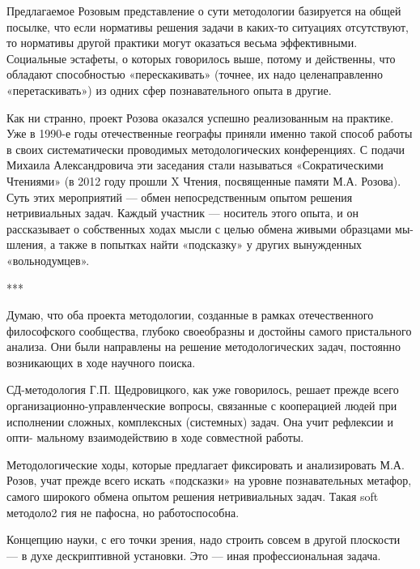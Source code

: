 \documentclass[11pt,a4paper]{article}
\begin{document}
Предлагаемое Розовым представление о сути методологии базируется на общей
посылке, что если нормативы решения задачи в каких-то ситуациях отсутствуют,
то нормативы другой практики могут оказаться весьма эффективными. Социальные
эстафеты, о которых говорилось выше, потому и действенны, что обладают
способностью «перескакивать» (точнее, их надо целенаправленно «перетаскивать»)
из одних сфер познавательного опыта в другие.

Как ни странно, проект Розова оказался успешно реализованным на
практике. Уже в 1990-е годы отечественные географы приняли именно такой
способ работы в своих систематически проводимых методологических
конференциях. С подачи Михаила Александровича эти заседания стали называться
«Сократическими Чтениями» (в 2012 году прошли X Чтения, посвященные памяти
М.А. Розова). Суть этих мероприятий — обмен непосредственным опытом решения
нетривиальных задач. Каждый участник — носитель этого опыта, и он
рассказывает о собственных ходах мысли с целью обмена живыми образцами мы-
шления, а также в попытках найти «подсказку» у других вынужденных
«вольнодумцев».

***

Думаю, что оба проекта методологии, созданные в рамках отечественного
философского сообщества, глубоко своеобразны и достойны самого пристального
анализа. Они были направлены на решение методологических задач, постоянно
возникающих в ходе научного поиска.

СД-методология Г.П. Щедровицкого, как уже говорилось, решает прежде всего
организационно-управленческие вопросы, связанные с кооперацией людей при
исполнении сложных, комплексных (системных) задач. Она учит рефлексии и опти-
мальному взаимодействию в ходе совместной работы.

Методологические ходы, которые предлагает фиксировать и анализировать
М.А. Розов, учат прежде всего искать «подсказки» на уровне познавательных
метафор, самого широкого обмена опытом решения нетривиальных задач. Такая
soft методоло2 гия не пафосна, но работоспособна.

Концепцию науки, с его точки зрения, надо строить совсем в другой плоскости —
в духе дескриптивной установки. Это — иная профессиональная задача.
\end{document}
